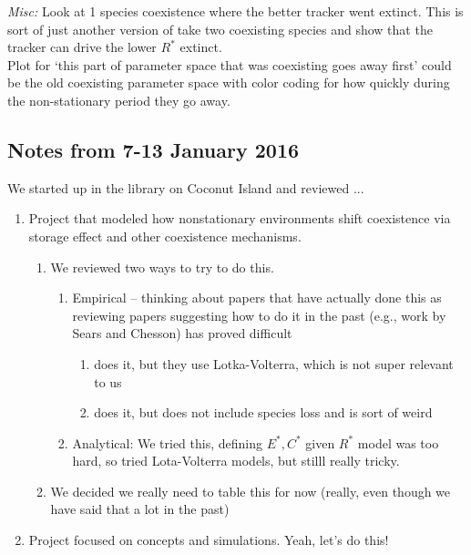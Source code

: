 \documentclass[11pt,a4paper,oneside]{article}
\begin{document}
\emph{Misc:} 
Look at 1 species coexistence where the better tracker went extinct. This is sort of just another version of take two coexisting species and show that the tracker can drive the lower $R^*$ extinct.\\

Plot for `this part of parameter space that was coexisting goes away first' could be the old coexisting parameter space with color coding for how quickly during the non-stationary period they go away. 

\subsection{Notes from 7-13 January 2016}
We started up in the library on Coconut Island and reviewed ...
\begin{enumerate}
\item Project that modeled how nonstationary environments shift coexistence via storage effect and other coexistence mechanisms. 
\begin{enumerate}
\item We reviewed two ways to try to do this.
\begin{enumerate}
\item Empirical -- thinking about papers that have actually done this as reviewing papers suggesting how to do it in the past (e.g., work by Sears and Chesson) has proved difficult
\begin{enumerate}
\item \citet{godoy2014} does it, but they use Lotka-Volterra, which is not super relevant to us
\item \citet{Angert:2009} does it, but does not include species loss and is sort of weird
\end{enumerate}
\item Analytical: We tried this, defining $E^{*}, C^{*}$ given $R^{*}$ model was too hard, so tried Lota-Volterra models, but stilll really tricky. 
\end{enumerate}
\item We decided we really need to table this for now (really, even though we have said that a lot in the past)
\end{enumerate}
\item Project focused on concepts and simulations. Yeah, let's do this!
\end{enumerate}
\end{document}
